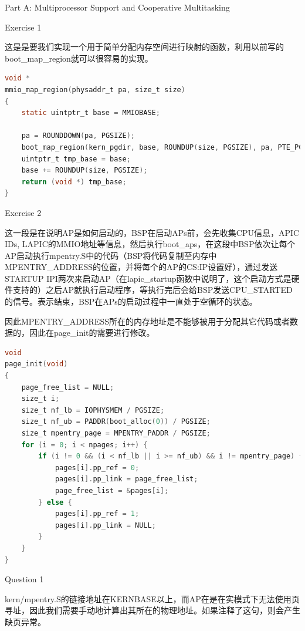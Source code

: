 \documentclass[GBK,winfonts,a4paper,10pt]{ctexart}
\begin{document}
\begin{section}{Part A: Multiprocessor Support and Cooperative Multitasking}
\begin{subsection}{Exercise 1}
\par
这是是要我们实现一个用于简单分配内存空间进行映射的函数，利用以前写的boot\_map\_region就可以很容易的实现。
\begin{lstlisting}[language=C]
void *
mmio_map_region(physaddr_t pa, size_t size)
{
	static uintptr_t base = MMIOBASE;

	pa = ROUNDDOWN(pa, PGSIZE);
	boot_map_region(kern_pgdir, base, ROUNDUP(size, PGSIZE), pa, PTE_PCD | PTE_PWT | PTE_W);
	uintptr_t tmp_base = base;
	base += ROUNDUP(size, PGSIZE);
	return (void *) tmp_base;
}
\end{lstlisting}
\end{subsection}

\begin{subsection}{Exercise 2}
\par
这一段是在说明AP是如何启动的，BSP在启动APs前，会先收集CPU信息，APIC IDs, LAPIC的MMIO地址等信息，然后执行boot\_aps，在这段中BSP依次让每个AP启动执行mpentry.S中的代码（BSP将代码复制至内存中MPENTRY\_ADDRESS的位置，并将每个的AP的CS:IP设置好），通过发送STARTUP IPI两次来启动AP（在lapic\_startup函数中说明了，这个启动方式是硬件支持的）之后AP就执行启动程序，等执行完后会给BSP发送CPU\_STARTED的信号。表示结束，BSP在APs的启动过程中一直处于空循环的状态。
\par
因此MPENTRY\_ADDRESS所在的内存地址是不能够被用于分配其它代码或者数据的，因此在page\_init的需要进行修改。
\begin{lstlisting}[language=C]
void
page_init(void)
{
    page_free_list = NULL;
    size_t i;
	size_t nf_lb = IOPHYSMEM / PGSIZE;
    size_t nf_ub = PADDR(boot_alloc(0)) / PGSIZE;
    size_t mpentry_page = MPENTRY_PADDR / PGSIZE;
    for (i = 0; i < npages; i++) {
        if (i != 0 && (i < nf_lb || i >= nf_ub) && i != mpentry_page) {
		    pages[i].pp_ref = 0;
            pages[i].pp_link = page_free_list;
		    page_free_list = &pages[i];
        } else {
            pages[i].pp_ref = 1;
            pages[i].pp_link = NULL;
        }
	}
}
\end{lstlisting}
\end{subsection}

\begin{subsection}{Question 1}
\par
kern/mpentry.S的链接地址在KERNBASE以上，而AP在是在实模式下无法使用页寻址，因此我们需要手动地计算出其所在的物理地址。如果注释了这句，则会产生缺页异常。
\end{subsection}


\end{section}
\end{document}
